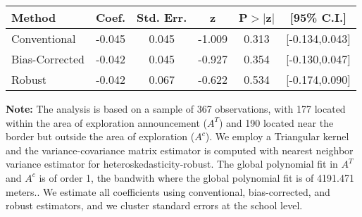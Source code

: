 \begin{table}[htbp]\centering
 \footnotesize 
\begin{tabular}{lccccc}
\hline\hline
Method & Coef. & Std. Err. & z & P$>|$z$|$ & [95\% C.I.] \\ 
\hline \hline  
Conventional & -0.045 & 0.045 & -1.009 & 0.313 & [-0.134,0.043] \\ 
 Bias-Corrected & -0.042 & 0.045 & -0.927 & 0.354 & [-0.130,0.047] \\ 
Robust & -0.042 & 0.067 & -0.622 & 0.534 & [-0.174,0.090] \\ 
  \hline\hline
\end{tabular}
\label{table:rd}
\begin{tablenotes} 
  \justifying \tiny \textbf{Note: }    
   The analysis is based on a sample of 367 observations, with 177 located within the area of exploration announcement ($A^{T}$) and 190 located near the border but outside the area of exploration  ($A^{c}$). 
           We employ a Triangular kernel and the variance-covariance matrix estimator is computed with nearest neighbor variance estimator for heteroskedasticity-robust. The global polynomial fit in  $A^{T}$ and $A^{c}$ is of order 1, the bandwith where the global polynomial fit is of 4191.471 meters.. We estimate all coefficients using conventional, bias-corrected, and robust estimators, and we cluster standard errors at the school level. \end{tablenotes} 
 \end{table} 
